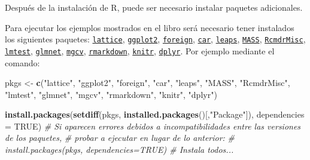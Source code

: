 \documentclass[]{book}
\newenvironment{Shaded}{\begin{snugshade}}{\end{snugshade}}
\newcommand{\CommentTok}[1]{\textcolor[rgb]{0.56,0.35,0.01}{\textit{#1}}}
\newcommand{\DataTypeTok}[1]{\textcolor[rgb]{0.13,0.29,0.53}{#1}}
\newcommand{\KeywordTok}[1]{\textcolor[rgb]{0.13,0.29,0.53}{\textbf{#1}}}
\newcommand{\NormalTok}[1]{#1}
\newcommand{\OtherTok}[1]{\textcolor[rgb]{0.56,0.35,0.01}{#1}}
\newcommand{\StringTok}[1]{\textcolor[rgb]{0.31,0.60,0.02}{#1}}
\begin{document}
Después de la instalación de R, puede ser necesario instalar paquetes
adicionales.

Para ejecutar los ejemplos mostrados en el libro será necesario tener instalados los siguientes paquetes:
\href{https://cran.r-project.org/web/packages/lattice/index.html}{\texttt{lattice}},
\href{https://cran.r-project.org/web/packages/ggplot2/index.html}{\texttt{ggplot2}},
\href{https://cran.r-project.org/web/packages/foreign/index.html}{\texttt{foreign}},
\href{https://cran.r-project.org/web/packages/car/index.html}{\texttt{car}},
\href{https://cran.r-project.org/web/packages/leaps/index.html}{\texttt{leaps}},
\href{https://cran.r-project.org/web/packages/MASS/index.html}{\texttt{MASS}},
\href{https://cran.r-project.org/web/packages/RcmdrMisc/index.html}{\texttt{RcmdrMisc}},
\href{https://cran.r-project.org/web/packages/lmtest/index.html}{\texttt{lmtest}},
\href{https://cran.r-project.org/web/packages/glmnet/index.html}{\texttt{glmnet}},
\href{https://cran.r-project.org/web/packages/mgcv/index.html}{\texttt{mgcv}},
\href{https://cran.r-project.org/web/packages/rmarkdown/index.html}{\texttt{rmarkdown}},
\href{https://cran.r-project.org/web/packages/knitr/index.html}{\texttt{knitr}},
\href{https://cran.r-project.org/web/packages/dplyr/index.html}{\texttt{dplyr}}.
Por ejemplo mediante el comando:

\begin{Shaded}
\begin{Highlighting}[]
\NormalTok{pkgs <-}\StringTok{ }\KeywordTok{c}\NormalTok{(}\StringTok{"lattice"}\NormalTok{, }\StringTok{"ggplot2"}\NormalTok{, }\StringTok{"foreign"}\NormalTok{, }\StringTok{"car"}\NormalTok{, }\StringTok{"leaps"}\NormalTok{, }\StringTok{"MASS"}\NormalTok{, }\StringTok{"RcmdrMisc"}\NormalTok{, }
          \StringTok{"lmtest"}\NormalTok{, }\StringTok{"glmnet"}\NormalTok{, }\StringTok{"mgcv"}\NormalTok{, }\StringTok{"rmarkdown"}\NormalTok{, }\StringTok{"knitr"}\NormalTok{, }\StringTok{"dplyr"}\NormalTok{)}

\KeywordTok{install.packages}\NormalTok{(}\KeywordTok{setdiff}\NormalTok{(pkgs, }\KeywordTok{installed.packages}\NormalTok{()[,}\StringTok{"Package"}\NormalTok{]), }\DataTypeTok{dependencies =} \OtherTok{TRUE}\NormalTok{)}
\CommentTok{# Si aparecen errores debidos a incompatibilidades entre las versiones de los paquetes, }
\CommentTok{# probar a ejecutar en lugar de lo anterior:}
\CommentTok{# install.packages(pkgs, dependencies=TRUE) # Instala todos...}
\end{Highlighting}
\end{Shaded}
\end{document}
